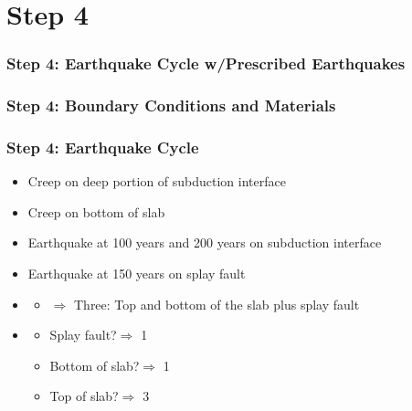 \documentclass[aspectratio=169]{beamer}
\begin{document}
\section{Step 4}

\begin{frame}
  \frametitle{Step 4: Earthquake Cycle w/Prescribed Earthquakes}
  \summary{}

  
\end{frame}

\begin{frame}
  \frametitle{Step 4: Boundary Conditions and Materials}
  \summary{}

  \begin{center}
  \end{center}
  
\end{frame}


\begin{frame}
  \frametitle{Step 4: Earthquake Cycle}
  \summary{}

  \begin{itemize}
  \item Creep on deep portion of subduction interface
  \item Creep on bottom of slab
  \item Earthquake at 100 years and 200 years on subduction interface
  \item Earthquake at 150 years on splay fault
  \end{itemize}
  
  \begin{itemize}
  \item {}\pause
    \begin{itemize}
    \item $\Rightarrow$ Three: Top and bottom of the slab plus splay fault
    \end{itemize}
  \item {}\pause
    \begin{itemize}
    \item Splay fault?\pause \quad $\Rightarrow$ 1\pause
    \item Bottom of slab?\pause \quad $\Rightarrow$ 1\pause
    \item Top of slab?\pause \quad $\Rightarrow$ 3
    \end{itemize}
  \end{itemize}
  
\end{frame}
\end{document}
